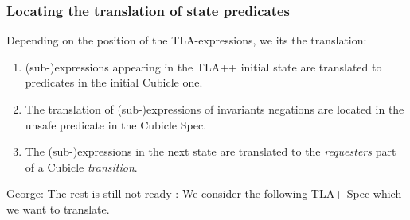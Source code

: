 \documentclass{article}
\theoremstyle{plain}
\numberwithin{equation}{section}
\begin{document}
\subsubsection{Locating  the translation of state predicates}

Depending on the position of the TLA-expressions,  we its the translation: 

\begin{enumerate}
\item  (sub-)expressions appearing in the TLA++ initial state are translated to  predicates  in the initial Cubicle one.   
\item The translation of (sub-)expressions of invariants negations are located in the unsafe predicate in the Cubicle Spec.  
\item The (sub-)expressions in the next state are translated to the \emph{requesters} part of a Cubicle \emph{transition}. 


\end{enumerate}

\iffalse

\begin{tikzpicture}[
  man/.style={rectangle,draw,fill=blue!20},
  woman/.style={rectangle,draw,fill=red!20,rounded corners=.8ex},
  grandchild/.style={grow=down,xshift=1em,anchor=west,
    edge from parent path={(\tikzparentnode.south) |- (\tikzchildnode.west)}},
  first/.style={level distance=6ex},
  second/.style={level distance=12ex},
  third/.style={level distance=18ex},
  level 1/.style={sibling distance=5em}]
    \coordinate
      child[grow=left] {node[man,anchor=east]{Jim}}
      child[grow=right] {node[woman,anchor=west]{Jane}}
      child[grow=down,level distance=0ex]
    [edge from parent fork down]
    child{node[man] {Alfred}
      child[grandchild,first] {node[man]{Joe}}
      child[grandchild,second] {node[woman]{Heather}}
      child[grandchild,third] {node[woman] {Barbara}}}
    child{node[woman] {Berta}
      child[grandchild,first] {node[man]{Howard}}}
    child {node[man] {Charles}}
    child {node[woman]{Doris}
      child[grandchild,first] {node[man]{Nick}}
      child[grandchild,second] {node[woman]{Liz}}};
\end{tikzpicture}l
\fi



\color{red} George: The rest is still not ready : 
We consider the following TLA+ Spec which we want to translate.
\end{document}
